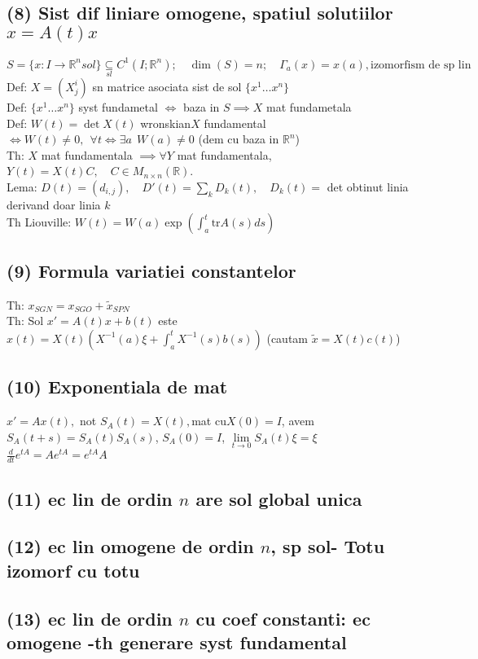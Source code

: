 \documentclass{article}
\newcommand*{\R}{\mathbb{R}}
\begin{document}
\subsection*{(8) Sist dif liniare omogene, spatiul solutiilor $x = A(t)x$ }
\[S = \{ x : I \to \R^n sol  \} \underset{sl}{\subseteq} C^1(I;\R^n);\quad \dim(S) = n;\quad \Gamma_a(x) = x(a), \text{izomorfism de sp lin} \]
Def: $X = (X^i_j)$ sn matrice asociata sist de sol $\{x^1 \ldots x^n\}$\\
Def: $\{x^1 \ldots x^n\}$ syst fundametal $\iff$ baza in $S \implies X$ mat fundametala \\
Def: $W(t) = \det X(t)$ wronskian\quad $X$ fundamental $\iff W(t) \neq 0,\ \ \forall t \iff \exists a\ \  W(a) \neq 0$ (dem cu baza in $\R^n$)\\
Th: $X$ mat fundamentala $\implies \forall Y$ mat fundamentala, $ Y(t) = X(t) C, \quad C \in M_{n\times n}(\R) $.\\
Lema: $D(t) =(d_{i,j}), \quad D'(t) = \displaystyle \sum_k D_k(t), \quad D_k(t) = $ det obtinut linia derivand doar linia $k$\\
Th Liouville: $W(t) = W(a) \exp\left( \int_a^t \mathrm{tr} A(s) ds \right)$

\subsection*{(9) Formula variatiei constantelor}
Th: $ x_{SGN} = x_{SGO}+ \tilde{x}_{SPN}$\\
Th: Sol $x' = A(t)x+b(t)$ este $x(t) = X(t)\left( X^{-1}(a)\xi + \int_a^tX^{-1}(s)b(s) \right) $ (cautam $\tilde{x} = X(t)c(t)$)
\subsection*{(10) Exponentiala de mat}
$x' = Ax(t),$ not $S_A(t)=X(t), $mat cu$ X(0)= I $, avem $S_A(t+s) = S_A(t)S_A(s)$, $S_A(0)=I$, $\lim\limits_{t\to 0} S_A(t)\xi=\xi$
$\displaystyle \frac{d}{dt} e^{tA} = A e^{tA} = e^{tA} A$
\subsection*{(11) ec lin de ordin $n$ are sol global unica}
\subsection*{(12) ec lin omogene de ordin $n$, sp sol-  Totu izomorf cu totu}
\subsection*{(13) ec lin de ordin $n$ cu coef constanti: ec omogene -th generare syst fundamental}
\end{document}
